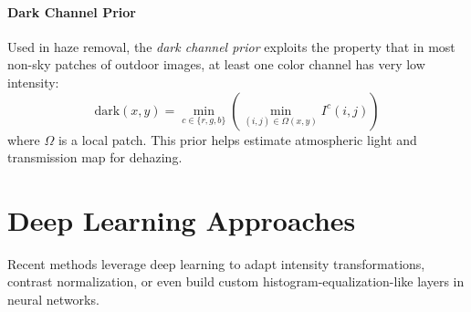\paragraph{Dark Channel Prior}
Used in haze removal, the \emph{dark channel prior} exploits the property that in most non-sky patches of outdoor images, at least one color channel has very low intensity:
$$
\text{dark}(x, y) = \min_{c \in \{r,g,b\}} \left( \min_{(i, j) \in \Omega(x, y)} I^c(i,j) \right)
$$
where $\Omega$ is a local patch. This prior helps estimate atmospheric light and transmission map for dehazing.


\section{Deep Learning Approaches}

Recent methods leverage deep learning to adapt intensity transformations, contrast normalization, or even build custom histogram-equalization-like layers in neural networks\cite{szeliski2010,govindjee2007,bovik2019,gonzalez2008}.



